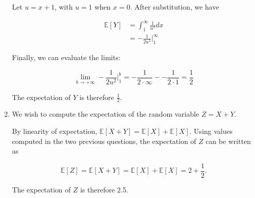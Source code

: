 \documentclass[12pt]{article}%
\begin{document}
\begin{enumerate}[label=(\alph*)]
Let $u = x + 1$, with $u = 1$ when $x = 0$. After substitution, we have

\begin{equation}
\begin{split}
\mathbb{E}[Y] &= \int_{1}^{\infty} \frac{1}{u^3}dx \\
&= -\frac{1}{2u^2} \Biggr|_{1}^{\infty}
\end{split}
\end{equation}

Finally, we can evaluate the limits:

\begin{equation}
\lim_{b \to +\infty} -\frac{1}{2u^2} \Biggr|_{1}^{b} = -\frac{1}{2 \cdot \infty} - -\frac{1}{2 \cdot 1} = \frac{1}{2}
\end{equation}

The expectation of $Y$ is therefore $\frac{1}{2}$.

\item We wish to compute the expectation of the random variable $Z = X + Y$.

By linearity of expectation, $\mathbb{E}[X + Y] = \mathbb{E}[X] + \mathbb{E}[X]$. Using values computed in the two previous questions, the expectation of $Z$ can be written as

\begin{equation}
\mathbb{E}[Z] = \mathbb{E}[X + Y] = \mathbb{E}[X] + \mathbb{E}[X] = 2 + \frac{1}{2}.
\end{equation}

The expectation of $Z$ is therefore 2.5.
\end{enumerate}
\end{document}
